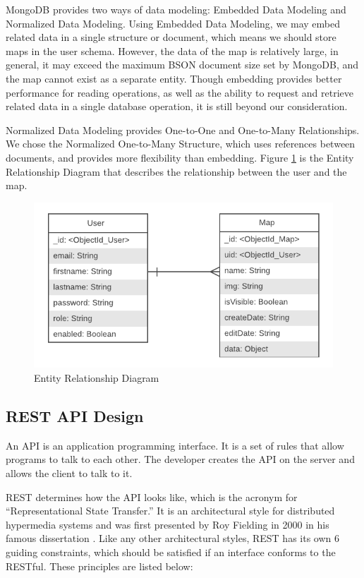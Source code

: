 MongoDB provides two ways of data modeling: Embedded Data Modeling and Normalized Data Modeling. Using Embedded Data Modeling, we may embed related data in a single structure or document, which means we should store maps in the user schema. However, the data of the map is relatively large, in general, it may exceed the maximum BSON document size set by MongoDB, and the map cannot exist as a separate entity. Though embedding provides better performance for reading operations, as well as the ability to request and retrieve related data in a single database operation, it is still beyond our consideration.

Normalized Data Modeling provides One-to-One and One-to-Many Relationships. We chose the Normalized One-to-Many Structure, which uses references between documents, and provides more flexibility than embedding. Figure \ref{fig:ER Diagram} is the Entity Relationship Diagram that describes the relationship between the user and the map.

\begin{figure}[htbp]
\centering
\includegraphics[width=\textwidth]{section03/assets/ER_Diagram.png}
\caption[Entity Relationship Diagram]{\label{fig:ER Diagram}Entity Relationship Diagram}
\end{figure}

\subsection{REST API Design}
\label{sec:Design>REST API Design}
An API is an application programming interface. It is a set of rules that allow programs to talk to each other. The developer creates the API on the server and allows the client to talk to it.

REST determines how the API looks like, which is the acronym for ``Representational State Transfer.'' It is an architectural style for distributed hypermedia systems and was first presented by Roy Fielding in 2000 in his famous dissertation \cite{paper:Fielding00architecturalstyles}. Like any other architectural styles, REST has its own 6 guiding constraints, which should be satisfied if an interface conforms to the RESTful. These principles are listed below:

